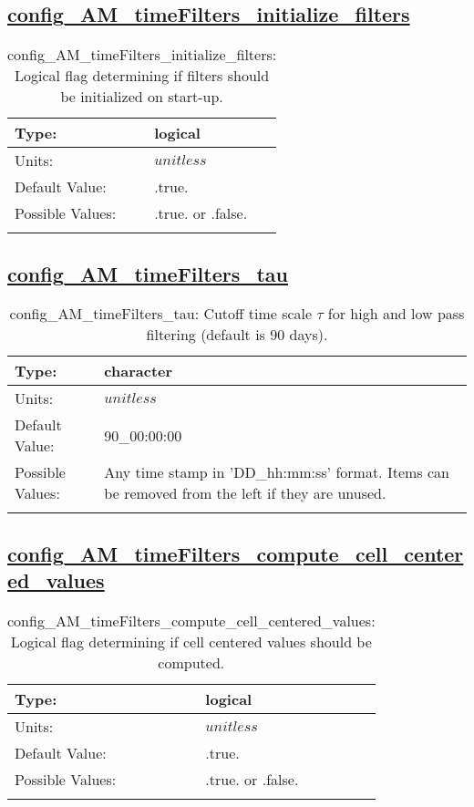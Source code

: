 \subsection[config\_AM\_timeFilters\_initialize\_filters]{\hyperref[sec:nm_tab_AM_timeFilters]{config\_AM\_timeFilters\_initialize\_filters}}
\label{subsec:nm_sec_config_AM_timeFilters_initialize_filters}
\begin{center}
\begin{longtable}{| p{2.0in} || p{4.0in} |}
    \hline
    Type: & logical \\
    \hline
    Units: & $unitless$ \\
    \hline
    Default Value: & .true. \\
    \hline
    Possible Values: & .true. or .false. \\
    \hline
    \caption{config\_AM\_timeFilters\_initialize\_filters: Logical flag determining if filters should be initialized on start-up.}
\end{longtable}
\end{center}
\subsection[config\_AM\_timeFilters\_tau]{\hyperref[sec:nm_tab_AM_timeFilters]{config\_AM\_timeFilters\_tau}}
\label{subsec:nm_sec_config_AM_timeFilters_tau}
\begin{center}
\begin{longtable}{| p{2.0in} || p{4.0in} |}
    \hline
    Type: & character \\
    \hline
    Units: & $unitless$ \\
    \hline
    Default Value: & 90\_00:00:00 \\
    \hline
    Possible Values: & Any time stamp in 'DD\_hh:mm:ss' format. Items can be removed from the left if they are unused. \\
    \hline
    \caption{config\_AM\_timeFilters\_tau:  Cutoff time scale  $\tau$  for high and low pass filtering (default is 90 days).}
\end{longtable}
\end{center}
\subsection[config\_AM\_timeFilters\_compute\_cell\_centered\_values]{\hyperref[sec:nm_tab_AM_timeFilters]{config\_AM\_timeFilters\_compute\_cell\_centered\_values}}
\label{subsec:nm_sec_config_AM_timeFilters_compute_cell_centered_values}
\begin{center}
\begin{longtable}{| p{2.0in} || p{4.0in} |}
    \hline
    Type: & logical \\
    \hline
    Units: & $unitless$ \\
    \hline
    Default Value: & .true. \\
    \hline
    Possible Values: & .true. or .false. \\
    \hline
    \caption{config\_AM\_timeFilters\_compute\_cell\_centered\_values: Logical flag determining if cell centered values should be computed.}
\end{longtable}
\end{center}
